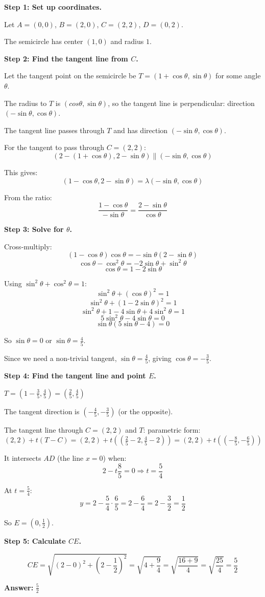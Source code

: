 ﻿\documentclass[12pt]{extarticle}
\begin{document}
\begin{solutionbox}
\textbf{Step 1: Set up coordinates.}

Let $A = (0, 0)$, $B = (2, 0)$, $C = (2, 2)$, $D = (0, 2)$.

The semicircle has center $(1, 0)$ and radius $1$.

\textbf{Step 2: Find the tangent line from $C$.}

Let the tangent point on the semicircle be $T = (1 + \cos\theta, \sin\theta)$ for some angle $\theta$.

The radius to $T$ is $(cos\theta, \sin\theta)$, so the tangent line is perpendicular:
direction $(-\sin\theta, \cos\theta)$.

The tangent line passes through $T$ and has direction $(-\sin\theta, \cos\theta)$.

For the tangent to pass through $C = (2, 2)$:
\[(2 - (1 + \cos\theta), 2 - \sin\theta) \parallel (-\sin\theta, \cos\theta)\]

This gives:
\[(1 - \cos\theta, 2 - \sin\theta) = \lambda(-\sin\theta, \cos\theta)\]

From the ratio:
\[\frac{1 - \cos\theta}{-\sin\theta} = \frac{2 - \sin\theta}{\cos\theta}\]

\textbf{Step 3: Solve for $\theta$.}

Cross-multiply:
\[(1 - \cos\theta)\cos\theta = -\sin\theta(2 - \sin\theta)\]
\[\cos\theta - \cos^2\theta = -2\sin\theta + \sin^2\theta\]
\[\cos\theta = 1 - 2\sin\theta\]

Using $\sin^2\theta + \cos^2\theta = 1$:
\[\sin^2\theta + (\cos\theta)^2 = 1\]
\[\sin^2\theta + (1 - 2\sin\theta)^2 = 1\]
\[\sin^2\theta + 1 - 4\sin\theta + 4\sin^2\theta = 1\]
\[5\sin^2\theta - 4\sin\theta = 0\]
\[\sin\theta(5\sin\theta - 4) = 0\]

So $\sin\theta = 0$ or $\sin\theta = \frac{4}{5}$.

Since we need a non-trivial tangent, $\sin\theta = \frac{4}{5}$, giving $\cos\theta = -\frac{3}{5}$.

\textbf{Step 4: Find the tangent line and point $E$.}

$T = (1 - \frac{3}{5}, \frac{4}{5}) = (\frac{2}{5}, \frac{4}{5})$

The tangent direction is $(-\frac{4}{5}, -\frac{3}{5})$ (or the opposite).

The tangent line through $C = (2, 2)$ and $T$:
parametric form: $(2, 2) + t(T - C) = (2, 2) + t((\frac{2}{5} - 2, \frac{4}{5} - 2)) = (2, 2) + t((-\frac{8}{5}, -\frac{6}{5}))$

It intersects $AD$ (the line $x = 0$) when:
\[2 - t\frac{8}{5} = 0 \Rightarrow t = \frac{5}{4}\]

At $t = \frac{5}{4}$:
\[y = 2 - \frac{5}{4} \cdot \frac{6}{5} = 2 - \frac{6}{4} = 2 - \frac{3}{2} = \frac{1}{2}\]

So $E = (0, \frac{1}{2})$.

\textbf{Step 5: Calculate $CE$.}

\[CE = \sqrt{(2-0)^2 + (2 - \frac{1}{2})^2} = \sqrt{4 + \frac{9}{4}} = \sqrt{\frac{16+9}{4}} = \sqrt{\frac{25}{4}} = \frac{5}{2}\]

\textbf{Answer:} $\boxed{\frac{5}{2}}$
\end{solutionbox}
\end{document}
